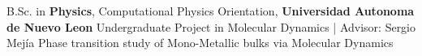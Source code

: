 %
%
%


\begin{scholarship}
					{B.Sc. in \textbf{Physics}, Computational Physics Orientation, \textbf{Universidad Autonoma de Nuevo Leon}}
	\scholarshipentry{}
					{Undergraduate Project in Molecular Dynamics | Advisor: Sergio Mejía}
	\scholarshipentry{}
					{Phase transition study of Mono-Metallic bulks via Molecular Dynamics}

\end{scholarship}